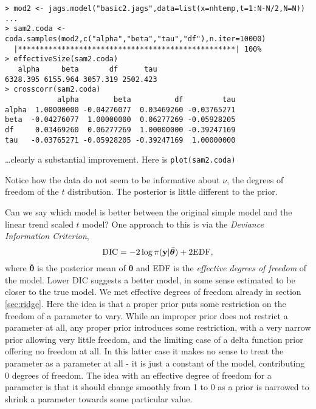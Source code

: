\documentclass[10pt] {article}
\newcommand{\eps}[3]
{{\begin{center}
 \rotatebox{#1}{\scalebox{#2}{\texttt{[image: \#3]}}}
 \end{center}}
}
\theoremstyle{definition}
\begin{document}
\begin{lstlisting}
> mod2 <- jags.model("basic2.jags",data=list(x=nhtemp,t=1:N-N/2,N=N))
...
> sam2.coda <- coda.samples(mod2,c("alpha","beta","tau","df"),n.iter=10000)
  |**************************************************| 100%
> effectiveSize(sam2.coda)
   alpha     beta       df      tau 
6328.395 6155.964 3057.319 2502.423 
> crosscorr(sam2.coda)
            alpha        beta          df         tau
alpha  1.00000000 -0.04276077  0.03469260 -0.03765271
beta  -0.04276077  1.00000000  0.06277269 -0.05928205
df     0.03469260  0.06277269  1.00000000 -0.39247169
tau   -0.03765271 -0.05928205 -0.39247169  1.00000000
\end{lstlisting}
\ldots clearly a substantial improvement. Here is \lstinline+plot(sam2.coda)+
\eps{-90}{.5}{nht-trace2.eps}
\noindent Notice how the data do not seem to be informative about $\nu$, the degrees of freedom of the $t$ distribution. The posterior is little different to the prior.  
 
Can we say which model is better between the original simple model and the linear trend scaled $t $ model? One approach to this is via the {\em Deviance Information Criterion},
$$
\text{DIC} = - 2 \log \pi({\bf y}|\bar {\bm \theta}) + 2 \text{EDF},
$$ 
where $\bar {\bm \theta}$ is the posterior mean of $\bm \theta$ and EDF is the {\em effective degrees of freedom} of the model. Lower DIC suggests a better model, in some sense estimated to be closer to the true model. We met effective degrees of freedom already in section \ref{sec:ridge}.  Here the idea is that a proper prior puts some restriction on the freedom of a parameter to vary. While an improper prior does not restrict a parameter at all, any proper prior introduces some restriction, with a very narrow prior allowing very little freedom, and the limiting case of a delta function prior offering no freedom at all. In this latter case it makes no sense to treat the parameter as a parameter at all - it is just a constant of the model, contributing 0 degrees of freedom. The idea with an effective degree of freedom for a parameter is that it should change smoothly from 1 to 0 as a prior is narrowed to shrink a parameter towards some particular value. 
\end{document}
